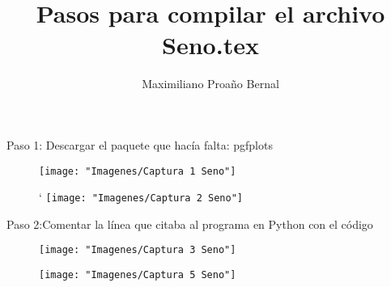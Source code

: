 \documentclass[]{article}
\title{Pasos para compilar el archivo Seno.tex}
\author{Maximiliano Proaño Bernal}
\begin{document}
\maketitle
Paso 1: Descargar el paquete que hacía falta: pgfplots
\begin{figure}[H]
	\centering
	\texttt{[image: "Imagenes/Captura 1 Seno"]}
	\caption{}
	\label{fig:captura-1-seno}
\end{figure}
\begin{figure}[H]`
	\centering
	\texttt{[image: "Imagenes/Captura 2 Seno"]}
	\caption{}
	\label{fig:captura-2-seno}
\end{figure}
Paso 2:Comentar la línea que citaba al programa en Python con el código
\begin{figure}[H]
	\centering
	\texttt{[image: "Imagenes/Captura 3 Seno"]}
	\caption{}
	\label{fig:captura-3-seno}
\end{figure}
\begin{figure}[H]
	\centering
	\texttt{[image: "Imagenes/Captura 5 Seno"]}
	\caption{}
	\label{fig:captura-5-seno}
\end{figure}


\section{}
\end{document}
